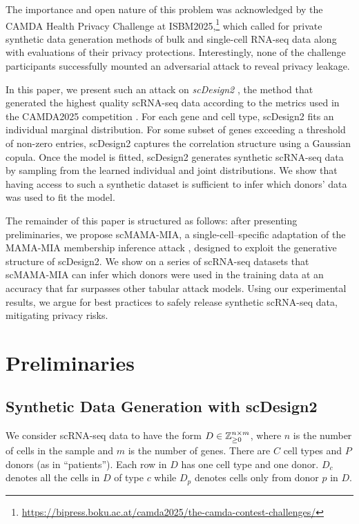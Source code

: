 \documentclass[unnumsec,webpdf,contemporary,large]{oup-authoring-template}%
\theoremstyle{thmstyleone}%
\theoremstyle{thmstyletwo}%
\theoremstyle{thmstylethree}%
\begin{document}
The importance and open nature of this problem was acknowledged by the CAMDA Health Privacy Challenge at ISBM2025,\footnote{\url{https://bipress.boku.ac.at/camda2025/the-camda-contest-challenges/}} which called for private synthetic data generation methods of bulk and single-cell RNA-seq data along with evaluations of their privacy protections. 
Interestingly, none of the challenge participants successfully mounted an adversarial attack to reveal privacy leakage.

In this paper, we present such an attack on \textit{scDesign2} \cite{sun2021scdesign2}, the method that generated the highest quality scRNA-seq data according to the metrics used in the CAMDA2025 competition \cite{mckeevercomparison_manual}. For each gene and cell type, scDesign2 fits an individual marginal distribution. For some subset of genes exceeding a threshold of non-zero entries, scDesign2 captures the correlation structure using a Gaussian copula. Once the model is fitted, scDesign2 generates synthetic scRNA-seq data by sampling from the learned individual and joint distributions. We show that having access to such a synthetic dataset is sufficient to infer which donors' data was used to fit the model.

The remainder of this paper is structured as follows: after presenting preliminaries,
we propose scMAMA-MIA, a single-cell--specific adaptation of the MAMA-MIA membership inference attack \cite{golob_privacy_2025}, designed to exploit the generative structure of scDesign2. 
We show on a series of scRNA-seq datasets that scMAMA-MIA can infer which donors were used in the training data at an accuracy that far surpasses other tabular attack models. 
Using our experimental results, we argue for best practices to safely release synthetic scRNA-seq data, mitigating privacy risks.



\section{Preliminaries}

\subsection{Synthetic Data Generation with scDesign2}

We consider scRNA-seq data to have the form $D \in \mathbb{Z}_{\small\geq0}^{n \times m}$, where $n$ is the number of cells in the sample and $m$ is the number of genes. There are $C$ cell types and $P$ donors (as in ``patients''). Each row in $D$ has one cell type and one donor. $D_{c}$ denotes all the cells in $D$ of type $c$ while $D_{p}$ denotes cells only from donor $p$ in $D$. 
\end{document}
